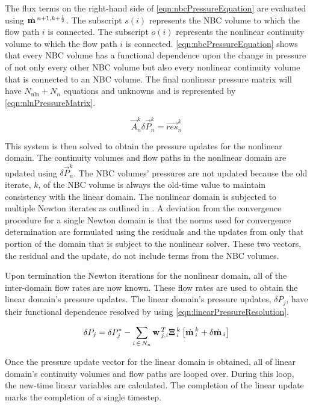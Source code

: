 The flux terms on the right-hand side of \eqref{eqn:nbcPressureEquation} are evaluated using $\momVec{}^{n+1,k+\onehalf}$.
The subscript $s(i)$ represents the NBC volume to which the flow path $i$ is connected.
The subscript $o(i)$ represents the nonlinear continuity volume to which the flow path $i$ is connected.
\eqref{eqn:nbcPressureEquation} shows that every NBC volume has a functional dependence upon the change in pressure of not only every other NBC volume but also every nonlinear continuity volume that is connected to an NBC volume.  
The final nonlinear pressure matrix will have $N_{\text{nln}} + N_{n}$ equations and unknowns and is represented by \eqref{eqn:nlnPressureMatrix}.

\begin{equation}
\label{eqn:nlnPressureMatrix}
\vec{A}^{k}_{n} \delta \vec{P}^{k}_{n} = \vec{res}^{k}_{n}
\end{equation}

This system is then solved to obtain the pressure updates for the nonlinear domain.
The continuity volumes and flow paths in the nonlinear domain are updated using $\delta \vec{P}^{k}_{n}$.
The NBC volumes' pressures are not updated because the old iterate, $k$, of the NBC volume is always the old-time value to maintain consistency with the linear domain.
The nonlinear domain is subjected to multiple Newton iterates as outlined in .
A deviation from the convergence procedure for a single Newton domain is that the norms used for convergence determination are formulated using the residuals and the updates from only that portion of the domain that is subject to the nonlinear solver.
These two vectors, the residual and the update, do not include terms from the NBC volumes.

Upon termination the Newton iterations for the nonlinear domain, all of the inter-domain flow rates are now known.
These flow rates are used to obtain the linear domain's pressure updates.
The linear domain's pressure updates, $\delta P_{j}$, have their functional dependence resolved by using \eqref{eqn:linearPressureResolution}.

\begin{equation}
\label{eqn:linearPressureResolution}
\delta P_{j} = \delta P^{*}_{j} - \sum_{i\,\in \, N_{n}} \vec{w}_{j,i}^{T} \vec{\Xi}^{k}_{i} \left[ \momVec{}^{k}_{i} + \delta \momVec{}_{i}\right]
\end{equation}

Once the pressure update vector for the linear domain is obtained, all of linear domain's continuity volumes and flow paths are looped over.
During this loop, the new-time linear variables are calculated.
The completion of the linear update marks the completion of a single timestep.

